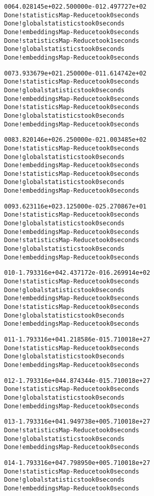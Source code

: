 \documentclass[letterpaper,10pt,english]{/usr/share/sphinx/texinputs/sphinxhowto}
\newenvironment{InvisibleVerbatim}
        {\begin{mdframed}[leftmargin=0.1\linewidth,innerleftmargin=3pt,innerrightmargin=3pt, userdefinedwidth=1\linewidth, linewidth=0pt, linecolor=white, usetwoside=false]}
        {\end{mdframed}}
\begin{document}
\begin{InvisibleVerbatim}
\begin{alltt}
 006   4.028145e+02   2.500000e-01   2.497727e+02
Done! statistics Map-Reduce took  0  seconds
Done! global statistics took  0  seconds
Done! embeddings Map-Reduce took  0  seconds
Done! statistics Map-Reduce took  1  seconds
Done! global statistics took  0  seconds
Done! embeddings Map-Reduce took  0  seconds

 007   3.933679e+02   1.250000e-01   1.614742e+02
Done! statistics Map-Reduce took  0  seconds
Done! global statistics took  0  seconds
Done! embeddings Map-Reduce took  0  seconds
Done! statistics Map-Reduce took  0  seconds
Done! global statistics took  0  seconds
Done! embeddings Map-Reduce took  0  seconds

 008   3.820146e+02   6.250000e-02   1.003485e+02
Done! statistics Map-Reduce took  0  seconds
Done! global statistics took  0  seconds
Done! embeddings Map-Reduce took  0  seconds
Done! statistics Map-Reduce took  0  seconds
Done! global statistics took  0  seconds
Done! embeddings Map-Reduce took  0  seconds

 009   3.623116e+02   3.125000e-02   5.270867e+01
Done! statistics Map-Reduce took  0  seconds
Done! global statistics took  0  seconds
Done! embeddings Map-Reduce took  0  seconds
Done! statistics Map-Reduce took  0  seconds
Done! global statistics took  0  seconds
Done! embeddings Map-Reduce took  0  seconds

 010  -1.793316e+04   2.437172e-01   6.269914e+02
Done! statistics Map-Reduce took  0  seconds
Done! global statistics took  0  seconds
Done! embeddings Map-Reduce took  0  seconds
Done! statistics Map-Reduce took  0  seconds
Done! global statistics took  0  seconds
Done! embeddings Map-Reduce took  0  seconds

 011  -1.793316e+04   1.218586e-01   5.710018e+27
Done! statistics Map-Reduce took  0  seconds
Done! global statistics took  0  seconds
Done! embeddings Map-Reduce took  0  seconds

 012  -1.793316e+04   4.874344e-01   5.710018e+27
Done! statistics Map-Reduce took  0  seconds
Done! global statistics took  0  seconds
Done! embeddings Map-Reduce took  0  seconds

 013  -1.793316e+04   1.949738e+00   5.710018e+27
Done! statistics Map-Reduce took  0  seconds
Done! global statistics took  0  seconds
Done! embeddings Map-Reduce took  0  seconds

 014  -1.793316e+04   7.798950e+00   5.710018e+27
Done! statistics Map-Reduce took  0  seconds
Done! global statistics took  0  seconds
Done! embeddings Map-Reduce took  0  seconds


\end{alltt}
\end{InvisibleVerbatim}
\end{document}

